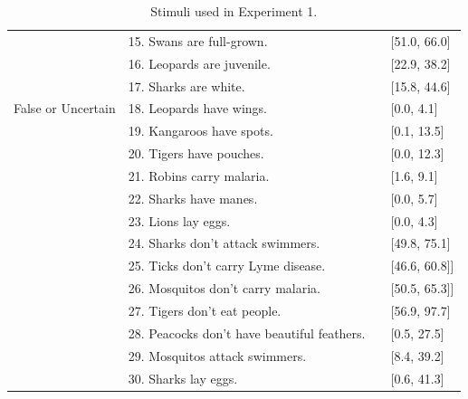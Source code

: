 \documentclass[10pt,letterpaper]{article}
\begin{document}
\begin{table}[h]
\begin{tabular}{| l | l | p{2.5cm} | p{3.5cm} |}
                                         & 15. Swans are full-grown. & & [51.0, 66.0]\\
                                         & 16. Leopards are juvenile. & & [22.9, 38.2] \\
                                         & 17. Sharks are white. & & [15.8, 44.6] \\
False or Uncertain & 18. Leopards have wings.       &               					 &[0.0, 4.1]\\
                                              & 19. Kangaroos have spots.                       &                &[0.1, 13.5]\\
                                              & 20.  Tigers have pouches.                       &                & [0.0, 12.3]\\
                                              & 21.  Robins carry malaria.                       &                &[1.6, 9.1]\\
                                              & 22. Sharks have manes.                       &                &[0.0, 5.7]\\
                                              & 23. Lions lay eggs.                       &                & [0.0, 4.3]\\
                                              & 24. Sharks don't attack swimmers.                       &                & [49.8, 75.1]\\
                                              & 25. Ticks don't carry Lyme disease.                       &                & [46.6, 60.8]]\\
                                              & 26. Mosquitos don't carry malaria.                       &                & [50.5, 65.3]]\\                                              
                                              & 27. Tigers don't eat people.                       &                & [56.9, 97.7]\\                                              
                                              & 28. Peacocks don't have beautiful feathers.                       &                & [0.5, 27.5]\\                                              
                                               & 29. Mosquitos attack swimmers.       &                & [8.4, 39.2]\\
			                         & 30. Sharks lay eggs.       &                & [0.6, 41.3]\\
\hline

\end{tabular}
\caption{Stimuli used in Experiment 1.}
\label{tab:expt1}
\end{table}
\end{document}
